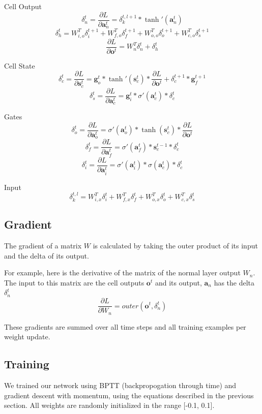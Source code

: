 \documentclass[11pt]{article}
\begin{document}
Cell Output
\[  \delta_{n}^{t} = \frac{\partial L}{\partial \textbf{a}_{n}^{t}} = \delta_{k}^{t,l+1}*\tanh'({\textbf{a}_{n}^{t}}) \]
\[ \delta_{h}^{t} = W_{i,o}^{T}\delta_{i}^{t+1} +  W_{f,o}^{T}\delta_{f}^{t+1} +  W_{o,o}^{T}\delta_{o}^{t+1} +  W_{c,o}^{T}\delta_{s}^{t+1} \]
\[ \frac{\partial L}{\partial \textbf{o}^{t}} = W_{n}^{T} \delta_{n}^{t} +  \delta_{h}^{t} \]

Cell State
\[ \delta_{c}^{t} = \frac{\partial L}{\partial \textbf{s}_{c}^{t}} = \textbf{g}_{o}^{t} * \tanh'({\textbf{s}_{c}^{t}}) * \frac{\partial L}{\partial \textbf{o}^{t}} + \delta_{c}^{t+1} * \textbf{g}_{f}^{t+1} \]
\[ \delta_{s}^{t} = \frac{\partial L}{\partial \textbf{a}_{c}^{t}} = \textbf{g}_{i}^{t} * \sigma'(\textbf{a}_{c}^{t}) * \delta_{c}^{t} \]

Gates
\[ \delta_{o}^{t} = \frac{\partial L}{\partial \textbf{a}_{o}^{t}} = \sigma'(\textbf{a}_{o}^{t}) * \tanh( \textbf{s}_{c}^{t}) * \frac{\partial L}{\partial \textbf{o}^{t}} \]
\[ \delta_{f}^{t} = \frac{\partial L}{\partial \textbf{a}_{f}^{t}} = \sigma'(\textbf{a}_{f}^{t}) * \textbf{s}_{c}^{t-1} * \delta_{c}^{t} \]
\[ \delta_{i}^{t} = \frac{\partial L}{\partial \textbf{a}_{i}^{t}} = \sigma'(\textbf{a}_{i}^{t}) * \sigma( \textbf{a}_{c}^{t}) * \delta_{c}^{t} \]

Input
\[  \delta_{k}^{t,l} = W_{i,x}^{T}\delta_{i}^{t} +  W_{f,x}^{T}\delta_{f}^{t} +  W_{o,x}^{T}\delta_{o}^{t} +  W_{c,x}^{T}\delta_{s}^{t} \]

\subsection{Gradient}

The gradient of a matrix \(W\) is calculated by
taking the outer product of its input and the delta
of its output.

For example, here is the derivative of the matrix of
the normal layer output \(W_{n}\). The input to
this matrix are the cell outputs \(\textbf{o}^{t}\) and
its output, \(\textbf{a}_{n}\) has the delta \(\delta_{n}^{t}\)
\[ \frac{\partial L}{\partial W_{n}} = outer(\textbf{o}^{t}, \delta_{n}^{t} ) \]

These gradients are summed over all time steps and
all training examples per weight update.

\subsection{Training}

We trained our network using BPTT (backpropogation through time) and
gradient descent with momentum, using the equations described in
the previous section. All weights are randomly initialized
in the range [-0.1, 0.1].
\end{document}
